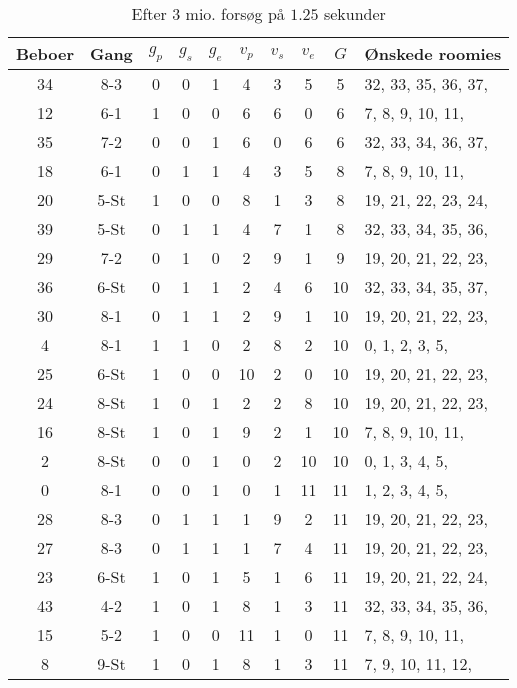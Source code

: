 \documentclass[article,oneside,11pt,a4paper]{memoir}
\newenvironment{assignment}[1]{
\begin{table}[h]
\caption{#1}
\footnotesize
\begin{center}
\begin{tabular}{cccccccccl}
\toprule
Beboer & Gang & $g_p$ & $g_s$ & $g_e$ & $v_p$ & $v_s$ & $v_e$ & $G$ & Ønskede roomies \\ \midrule
}{
\bottomrule
\end{tabular}
\end{center}
\end{table}

}
\begin{document}
\begin{assignment}{Efter 3 mio. forsøg på $1.25$ sekunder}
    34 & 8-3  &   0 &   0 &   1 &   4 &   3 &   5 &  5 &  32, 33, 35, 36, 37, \\
    12 & 6-1  &   1 &   0 &   0 &   6 &   6 &   0 &  6 &   7,  8,  9, 10, 11, \\
    35 & 7-2  &   0 &   0 &   1 &   6 &   0 &   6 &  6 &  32, 33, 34, 36, 37, \\
    18 & 6-1  &   0 &   1 &   1 &   4 &   3 &   5 &  8 &   7,  8,  9, 10, 11, \\
    20 & 5-St &   1 &   0 &   0 &   8 &   1 &   3 &  8 &  19, 21, 22, 23, 24, \\
    39 & 5-St &   0 &   1 &   1 &   4 &   7 &   1 &  8 &  32, 33, 34, 35, 36, \\
    29 & 7-2  &   0 &   1 &   0 &   2 &   9 &   1 &  9 &  19, 20, 21, 22, 23, \\
    36 & 6-St &   0 &   1 &   1 &   2 &   4 &   6 & 10 &  32, 33, 34, 35, 37, \\
    30 & 8-1  &   0 &   1 &   1 &   2 &   9 &   1 & 10 &  19, 20, 21, 22, 23, \\
     4 & 8-1  &   1 &   1 &   0 &   2 &   8 &   2 & 10 &   0,  1,  2,  3,  5, \\
    25 & 6-St &   1 &   0 &   0 &  10 &   2 &   0 & 10 &  19, 20, 21, 22, 23, \\
    24 & 8-St &   1 &   0 &   1 &   2 &   2 &   8 & 10 &  19, 20, 21, 22, 23, \\
    16 & 8-St &   1 &   0 &   1 &   9 &   2 &   1 & 10 &   7,  8,  9, 10, 11, \\
     2 & 8-St &   0 &   0 &   1 &   0 &   2 &  10 & 10 &   0,  1,  3,  4,  5, \\
     0 & 8-1  &   0 &   0 &   1 &   0 &   1 &  11 & 11 &   1,  2,  3,  4,  5, \\
    28 & 8-3  &   0 &   1 &   1 &   1 &   9 &   2 & 11 &  19, 20, 21, 22, 23, \\
    27 & 8-3  &   0 &   1 &   1 &   1 &   7 &   4 & 11 &  19, 20, 21, 22, 23, \\
    23 & 6-St &   1 &   0 &   1 &   5 &   1 &   6 & 11 &  19, 20, 21, 22, 24, \\
    43 & 4-2  &   1 &   0 &   1 &   8 &   1 &   3 & 11 &  32, 33, 34, 35, 36, \\
    15 & 5-2  &   1 &   0 &   0 &  11 &   1 &   0 & 11 &   7,  8,  9, 10, 11, \\
     8 & 9-St &   1 &   0 &   1 &   8 &   1 &   3 & 11 &   7,  9, 10, 11, 12, \\

\end{assignment}
\end{document}
